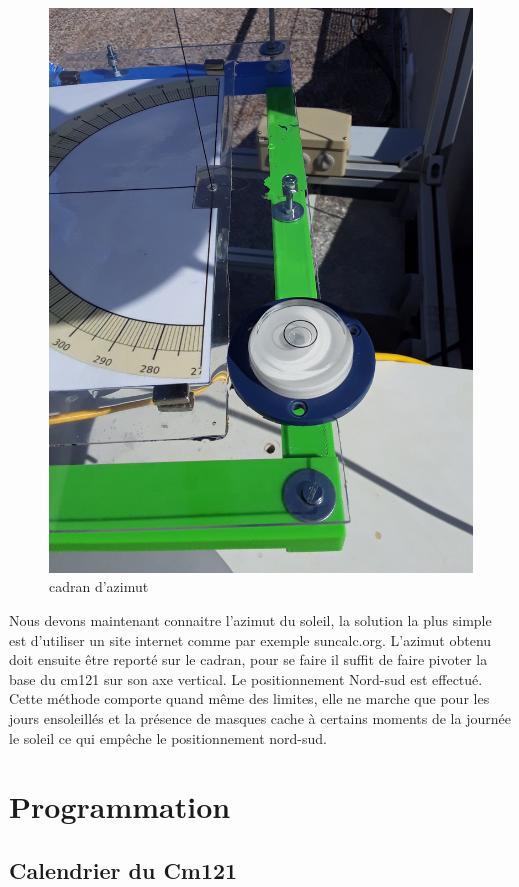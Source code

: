 \documentclass[12pt,a4paper]{article}
\begin{document}
\begin{flushleft}
\begin{figure}[H]
\centering
\includegraphics[width=12cm]{image/montage/boussole_solaire/7.jpg} 
\caption{cadran d'azimut}
\end{figure}

Nous devons maintenant connaitre l'azimut du soleil, la solution la plus simple est d'utiliser un site internet comme par exemple suncalc.org. L'azimut obtenu doit ensuite être reporté sur le cadran, pour se faire il suffit de faire pivoter la base du cm121 sur son axe vertical. Le positionnement Nord-sud est effectué.\\
Cette méthode comporte quand même des limites, elle ne marche que pour les jours ensoleillés et la présence de masques cache à certains moments de la journée le soleil ce qui empêche le positionnement nord-sud. 
 
\section{Programmation}

\subsection{Calendrier du Cm121}


\end{flushleft}
\end{document}

